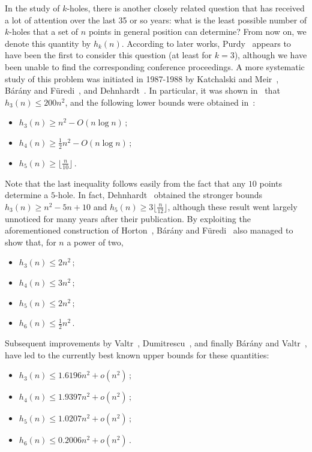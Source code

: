 \documentclass[12pt,reqno, a4paper]{amsart}
\begin{document}
In the study of $k$-holes, there is another closely related question that has received a lot of attention over the last 35 or so years: what is the least possible number of $k$-holes that a set of $n$ points in general position can determine? From now on, we denote this quantity by $h_k(n)$. According to later works, Purdy~\cite{purdy1982minimum} appears to have been the first to consider this question (at least for $k=3$), although we have been unable to find the corresponding conference proceedings. A more systematic study of this problem was initiated in 1987-1988 by Katchalski and Meir~\cite{katchalski1988empty}, Bárány and Füredi~\cite{barany1987empty}, and Dehnhardt~\cite{Dehnhardt1987}. In particular, it was shown in~\cite{katchalski1988empty} that $h_3(n)\leq 200n^2$, and the following lower bounds were obtained in~\cite{barany1987empty}:
\begin{itemize}
    \item $ h_3(n)\geq n^2-O(n\log n)\,;$

    \item $h_4(n)\geq \frac{1}{2}n^2-O(n\log n)\,;$

    \item $h_5(n)\geq \lfloor\frac{n}{10}\rfloor\,.$
\end{itemize}
Note that the last inequality follows easily from the fact that any $10$ points determine a $5$-hole. In fact, Dehnhardt~\cite{Dehnhardt1987} obtained the stronger bounds $h_3(n)\geq n^2-5n+10$ and $h_5(n)\geq3\lfloor\frac{n}{12}\rfloor$, although these result went largely unnoticed for many years after their publication. By exploiting the aforementioned construction of Horton~\cite{horton1983sets}, Bárány and Füredi~\cite{barany1987empty} also managed to show that, for $n$ a power of two, \begin{itemize}
    \item $ h_3(n)\leq2 n^2\,;$

    \item $h_4(n)\leq 3n^2\,;$

    \item $h_5(n)\leq 2n^2\,;$

    \item $h_6(n)\leq \frac{1}{2}n^2\,.$
\end{itemize}


Subsequent improvements by Valtr~\cite{Valtr1995}, Dumitrescu~\cite{dumitrescu2000planar}, and finally Bárány and Valtr~\cite{barany2004planar}, have led to the currently best known upper bounds for these quantities:
\begin{itemize}
    \item $h_3(n)\leq 1.6196n^2 + o(n^2)\,;$

    \item $h_4(n)\leq 1.9397n^2 + o(n^2)\,;$

    \item $h_5(n)\leq 1.0207n^2+o(n^2)\,;$

    \item $h_6(n) \leq 0.2006n^2 + o(n^2)\,.$
\end{itemize}
\end{document}
